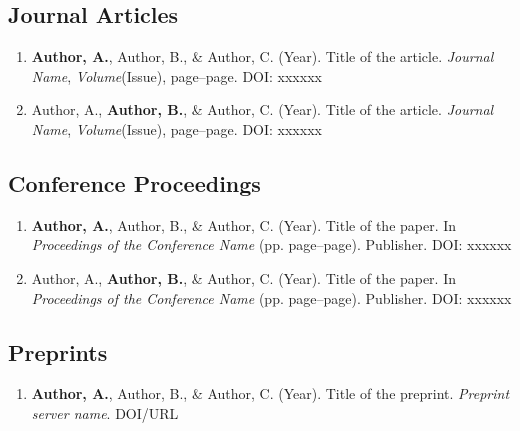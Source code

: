 
\begin{cvparagraph}
\subsection*{Journal Articles}
\begin{enumerate}
    \item \textbf{Author, A.}, Author, B., \& Author, C. (Year). Title of the article. \textit{Journal Name}, \textit{Volume}(Issue), page–page. DOI: xxxxxx
    \item Author, A., \textbf{Author, B.}, \& Author, C. (Year). Title of the article. \textit{Journal Name}, \textit{Volume}(Issue), page–page. DOI: xxxxxx
\end{enumerate}

\subsection*{Conference Proceedings}
\begin{enumerate}
    \item \textbf{Author, A.}, Author, B., \& Author, C. (Year). Title of the paper. In \textit{Proceedings of the Conference Name} (pp. page–page). Publisher. DOI: xxxxxx
    \item Author, A., \textbf{Author, B.}, \& Author, C. (Year). Title of the paper. In \textit{Proceedings of the Conference Name} (pp. page–page). Publisher. DOI: xxxxxx
\end{enumerate}

\subsection*{Preprints}
\begin{enumerate}
    \item \textbf{Author, A.}, Author, B., \& Author, C. (Year). Title of the preprint. \textit{Preprint server name}. DOI/URL
\end{enumerate}
\end{cvparagraph}
